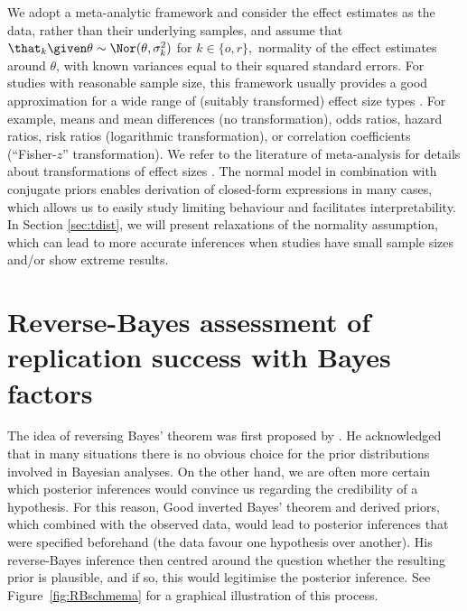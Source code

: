 We adopt a meta-analytic framework and consider the effect estimates as the
data, rather than their underlying samples, and assume that
$\that_k \given \theta \sim \Nor(\theta, \sigma^2_k)$ for $k \in \{o, r\},$ \ie
normality of the effect estimates around $\theta$, with known variances equal to
their squared standard errors. For studies with reasonable sample size, this
framework usually provides a good approximation for a wide range of (suitably
transformed) effect size types \citep[Chapter 2.4]{Spiegelhalter2004}. For
example, means and mean differences (no transformation), odds ratios, hazard
ratios, risk ratios (logarithmic transformation), or correlation coefficients
(``Fisher-$z$'' transformation). We refer to the literature of meta-analysis for
details about transformations of effect sizes \citep[\eg][Chapter
11.6]{Cooper2019}. The normal model in combination with conjugate priors enables
derivation of closed-form expressions in many cases, which allows us to easily
study limiting behaviour and facilitates interpretability. In Section
\ref{sec:tdist}, we will present relaxations of the normality assumption, which
can lead to more accurate inferences when studies have small sample sizes and/or
show extreme results.


\section{Reverse-Bayes assessment of replication success with Bayes factors}
\label{sec:methods}
The idea of reversing Bayes' theorem was first proposed by \citet{Good1950}. He
acknowledged that in many situations there is no obvious choice for the prior
distributions involved in Bayesian analyses. On the other hand, we are often
more certain which posterior inferences would convince us regarding the
credibility of a hypothesis. For this reason, Good inverted Bayes' theorem and
derived priors, which combined with the observed data, would lead to posterior
inferences that were specified beforehand (\eg the data favour one hypothesis
over another). His reverse-Bayes inference then centred around the question
whether the resulting prior is plausible, and if so, this would legitimise the
posterior inference. See Figure~\ref{fig:RBschmema} for a graphical illustration
of this process.

